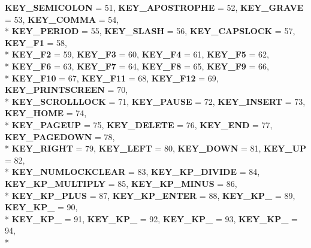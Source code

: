 \begin{DoxyCompactItemize}
{\bfseries K\+E\+Y\+\_\+\+S\+E\+M\+I\+C\+O\+L\+O\+N} = 51, 
{\bfseries K\+E\+Y\+\_\+\+A\+P\+O\+S\+T\+R\+O\+P\+H\+E} = 52, 
{\bfseries K\+E\+Y\+\_\+\+G\+R\+A\+V\+E} = 53, 
{\bfseries K\+E\+Y\+\_\+\+C\+O\+M\+M\+A} = 54, 
\\*
{\bfseries K\+E\+Y\+\_\+\+P\+E\+R\+I\+O\+D} = 55, 
{\bfseries K\+E\+Y\+\_\+\+S\+L\+A\+S\+H} = 56, 
{\bfseries K\+E\+Y\+\_\+\+C\+A\+P\+S\+L\+O\+C\+K} = 57, 
{\bfseries K\+E\+Y\+\_\+\+F1} = 58, 
\\*
{\bfseries K\+E\+Y\+\_\+\+F2} = 59, 
{\bfseries K\+E\+Y\+\_\+\+F3} = 60, 
{\bfseries K\+E\+Y\+\_\+\+F4} = 61, 
{\bfseries K\+E\+Y\+\_\+\+F5} = 62, 
\\*
{\bfseries K\+E\+Y\+\_\+\+F6} = 63, 
{\bfseries K\+E\+Y\+\_\+\+F7} = 64, 
{\bfseries K\+E\+Y\+\_\+\+F8} = 65, 
{\bfseries K\+E\+Y\+\_\+\+F9} = 66, 
\\*
{\bfseries K\+E\+Y\+\_\+\+F10} = 67, 
{\bfseries K\+E\+Y\+\_\+\+F11} = 68, 
{\bfseries K\+E\+Y\+\_\+\+F12} = 69, 
{\bfseries K\+E\+Y\+\_\+\+P\+R\+I\+N\+T\+S\+C\+R\+E\+E\+N} = 70, 
\\*
{\bfseries K\+E\+Y\+\_\+\+S\+C\+R\+O\+L\+L\+L\+O\+C\+K} = 71, 
{\bfseries K\+E\+Y\+\_\+\+P\+A\+U\+S\+E} = 72, 
{\bfseries K\+E\+Y\+\_\+\+I\+N\+S\+E\+R\+T} = 73, 
{\bfseries K\+E\+Y\+\_\+\+H\+O\+M\+E} = 74, 
\\*
{\bfseries K\+E\+Y\+\_\+\+P\+A\+G\+E\+U\+P} = 75, 
{\bfseries K\+E\+Y\+\_\+\+D\+E\+L\+E\+T\+E} = 76, 
{\bfseries K\+E\+Y\+\_\+\+E\+N\+D} = 77, 
{\bfseries K\+E\+Y\+\_\+\+P\+A\+G\+E\+D\+O\+W\+N} = 78, 
\\*
{\bfseries K\+E\+Y\+\_\+\+R\+I\+G\+H\+T} = 79, 
{\bfseries K\+E\+Y\+\_\+\+L\+E\+F\+T} = 80, 
{\bfseries K\+E\+Y\+\_\+\+D\+O\+W\+N} = 81, 
{\bfseries K\+E\+Y\+\_\+\+U\+P} = 82, 
\\*
{\bfseries K\+E\+Y\+\_\+\+N\+U\+M\+L\+O\+C\+K\+C\+L\+E\+A\+R} = 83, 
{\bfseries K\+E\+Y\+\_\+\+K\+P\+\_\+\+D\+I\+V\+I\+D\+E} = 84, 
{\bfseries K\+E\+Y\+\_\+\+K\+P\+\_\+\+M\+U\+L\+T\+I\+P\+L\+Y} = 85, 
{\bfseries K\+E\+Y\+\_\+\+K\+P\+\_\+\+M\+I\+N\+U\+S} = 86, 
\\*
{\bfseries K\+E\+Y\+\_\+\+K\+P\+\_\+\+P\+L\+U\+S} = 87, 
{\bfseries K\+E\+Y\+\_\+\+K\+P\+\_\+\+E\+N\+T\+E\+R} = 88, 
{\bfseries K\+E\+Y\+\_\+\+K\+P\+\_} = 89, 
{\bfseries K\+E\+Y\+\_\+\+K\+P\+\_} = 90, 
\\*
{\bfseries K\+E\+Y\+\_\+\+K\+P\+\_} = 91, 
{\bfseries K\+E\+Y\+\_\+\+K\+P\+\_} = 92, 
{\bfseries K\+E\+Y\+\_\+\+K\+P\+\_} = 93, 
{\bfseries K\+E\+Y\+\_\+\+K\+P\+\_} = 94, 
\\*

\end{DoxyCompactItemize}
